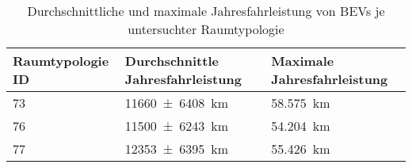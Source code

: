 {
\renewcommand{\arraystretch}{1.2}%
\begin{table}[H]
	\begin{center}
		\caption{Durchschnittliche und maximale Jahresfahrleistung von BEVs je untersuchter Raumtypologie}
		\begin{tabu} to \textwidth {X[1] X[1.5, r] X[1.5, r]}
			\hline
			Raumtypologie ID 	   & Durchschnittle Jahresfahrleistung                  & Maximale Jahresfahrleistung \\ \hline
			\num{73}               & \SI[separate-uncertainty = true]{11660(6408)}{\km} & \SI{58.575}{\km}            \\
			\num{76}               & \SI[separate-uncertainty = true]{11500(6243)}{\km} & \SI{54.204}{\km}            \\
			\num{77}               & \SI[separate-uncertainty = true]{12353(6395)}{\km} & \SI{55.426}{\km}            \\ \hline
		\end{tabu}
		\label{tab:bev_distance}
	\end{center}
	\vspace{-3mm}%
\end{table}
}